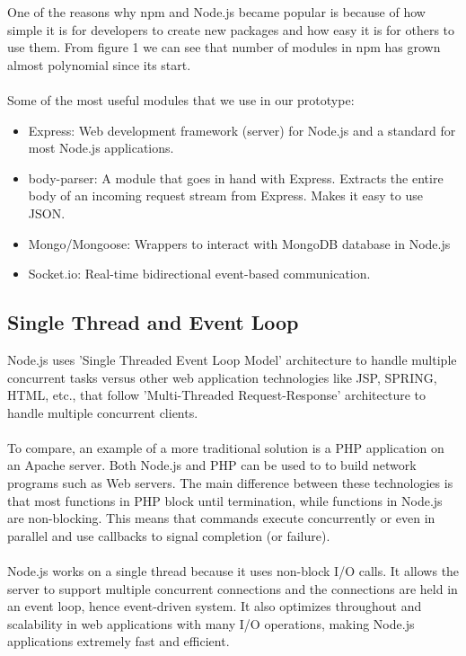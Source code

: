One of the reasons why npm and Node.js became popular is because of how simple it is for developers to create new packages and how easy it is for others to use them. From figure 1 we can see that number of modules in npm has grown almost polynomial since its start. 
\\\\
Some of the most useful modules that we use in our prototype: 
\begin{itemize}
    \item Express: Web development framework (server) for Node.js and a standard for most Node.js applications.
    \item body-parser: A module that goes in hand with Express. Extracts the entire body of an incoming request stream from Express. Makes it easy to use JSON.
    \item Mongo/Mongoose: Wrappers to interact with MongoDB database in Node.js
    \item Socket.io: Real-time bidirectional event-based communication.  
\end{itemize}

\subsection{Single Thread and Event Loop}
Node.js uses 'Single Threaded Event Loop Model' architecture to handle multiple concurrent tasks versus other web application technologies like JSP, SPRING, HTML, etc., that follow 'Multi-Threaded Request-Response' architecture to handle multiple concurrent clients. 
\\\\
To compare, an example of a more traditional solution is a PHP application on an Apache server. Both Node.js and PHP can be used to to build network programs such as Web servers. The main difference between these technologies is that most functions in PHP block until termination, while functions in Node.js are non-blocking. This means that commands execute concurrently or even in parallel and use callbacks to signal completion (or failure). 
\\\\
Node.js works on a single thread because it uses non-block I/O calls. It allows the server to support multiple concurrent connections and the connections are held in an event loop, hence event-driven system.
It also optimizes throughout and scalability in web applications with many I/O operations, making Node.js applications extremely fast and efficient. \cite{docs:eventloop}

